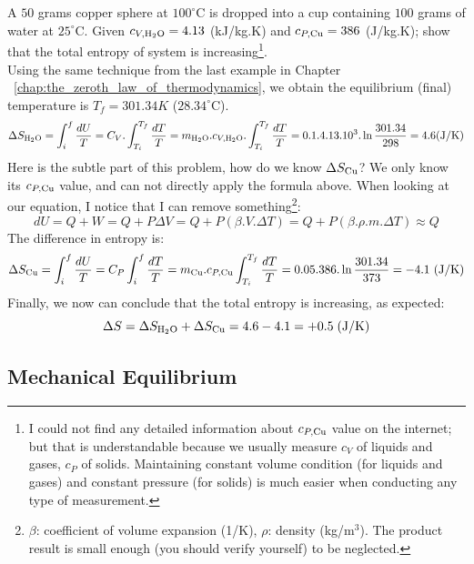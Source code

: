 \documentclass[~/PhyAI/phyai.tex]{subfiles}
\begin{document}
\begin{exmp}
	A $50$ grams copper sphere at $100^{\circ}$C is dropped into a cup containing $100$ grams of water at $25^{\circ}$C. Given $c_{V,\ce{H2O}}=4.13$ (kJ/kg.K) and $c_{P,\ce{Cu}}=386$ (J/kg.K); show that the total entropy of system is increasing\footnote[1]{I could not find any detailed information about $c_{P,\ce{Cu}}$ value on the internet; but that is understandable because we usually measure $c_{V}$ of liquids and gases, $c_{P}$ of solids. Maintaining constant volume condition (for liquids and gases) and constant pressure (for solids) is much easier when conducting any type of measurement.}.
	\\ \indent Using the same technique from the last example in Chapter ~\ref{chap:the_zeroth_law_of_thermodynamics}, we obtain the equilibrium (final) temperature is $T_{f}=301.34K$ ($28.34^{\circ}$C).
	\begin{equation*}
		\begin{split}
			\Delta S_{\ce{H2O}}&=\int_{i }^{f}\frac{dU }{T}=C_{V}.\int_{T_{i} }^{T_{f}} \frac{dT }{T}=m_{\ce{H2O}}.c_{V,\ce{H2O}}.\int_{T_{i} }^{T_{f}} \frac{dT }{T}=0.1.4.13.10^{3}.\ln{\frac{301.34}{298}}=4.6\text{(J/K)}\\
		\end{split}
	\end{equation*}
	Here is the subtle part of this problem, how do we know $\Delta S_{\ce{Cu}}$? We only know its $c_{P,\ce{Cu}}$ value, and can not directly apply the formula above. When looking at our equation, I notice that I can remove something\footnote[2]{$\beta$:  coefficient of volume expansion (1/K), $\rho$: density (kg/$\text{m}^3$). The product result is small enough (you should verify yourself) to be neglected.  }:
	$$ dU=Q+W=Q+P\Delta V=Q+P(\beta.V.\Delta T)=Q+P(\beta.\rho.m.\Delta T)\approx Q$$
	The difference in entropy is:
	$$ \Delta S_{\ce{Cu}}=\int_{i }^{f}\frac{dU }{T}=C_{P}\int_{i }^{f}\frac{dT }{T}=m_{\ce{Cu}}.c_{P,\ce{Cu}}\int_{T_{i} }^{T_{f}}\frac{dT }{T}=0.05.386.\ln{\frac{301.34 }{373}}=-4.1\text{ (J/K)}    $$
	Finally, we now can conclude that the total entropy is increasing, as expected:
	$$ \Delta S=\Delta S_{\ce{H2O}}+\Delta S_{\ce{Cu}}=4.6-4.1=+0.5\;\text{(J/K)} $$
\end{exmp}
\subsection{Mechanical Equilibrium}\label{sec:mechanical_equilibrium} %
\end{document}
